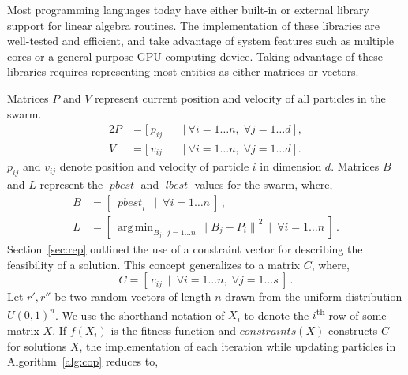 \documentclass[10pt]{article}
\newcommand{\tsup}{\textsuperscript}
\DeclareMathOperator*{\argmin}{arg\,min}
\DeclareMathOperator*{\pbest}{\mathit{pbest}}
\DeclareMathOperator*{\lbest}{\mathit{lbest}}
\begin{document}
\begin{appendices}
  Most programming languages today have either built-in or external library support for linear algebra routines. The
  implementation of these libraries are well-tested and efficient, and take advantage of system features such as
  multiple cores or a general purpose GPU computing device. Taking advantage of these libraries requires representing
  most entities as either matrices or vectors. 

  Matrices $P$ and $V$ represent current position and velocity of all particles in the swarm.
  \begin{alignat*}{2}
    P &= [\ p_{ij}\ &&\mid\ \forall i=1\dots n,\;\forall j=1\dots d\ ]\,,\\
    V &= [\ v_{ij}\ &&\mid\ \forall i=1\dots n,\;\forall j=1\dots d\ ]\,.
  \end{alignat*}
  $p_{ij}$ and $v_{ij}$ denote position and velocity of particle $i$ in dimension $d$. Matrices $B$ and $L$ represent
  the $\pbest$ and $\lbest$ values for the swarm, where,
  \begin{align*}
    B &= [\ {\pbest}_i\ \mid\ \forall i=1\dots n\ ]\,,\\
    L &= [\ \argmin_{B_j,\ j = 1\dots n} {\|B_j - P_i\|}^2\ \mid\ \forall i=1\dots n\ ]\,.
  \end{align*}
  Section~\ref{sec:rep} outlined the use of a constraint vector for describing the feasibility of a solution. This
  concept generalizes to a matrix $C$, where,
  \begin{equation*}
    C = [\ c_{ij}\ \mid\ \forall i=1\dots n,\;\forall j=1\dots s\ ]\,.
  \end{equation*}
  Let $r',r''$ be two random vectors of length $n$ drawn from the uniform distribution ${U(0,1)}^n$. We use the
  shorthand notation of $X_i$ to denote the $i$\tsup{th} row of some matrix $X$. If $f(X_i)$ is the fitness function and
  $\mathit{constraints}(X)$ constructs $C$ for solutions $X$, the implementation of each iteration while updating
  particles in Algorithm~\ref{alg:cop} reduces to,


\end{appendices}
\end{document}
